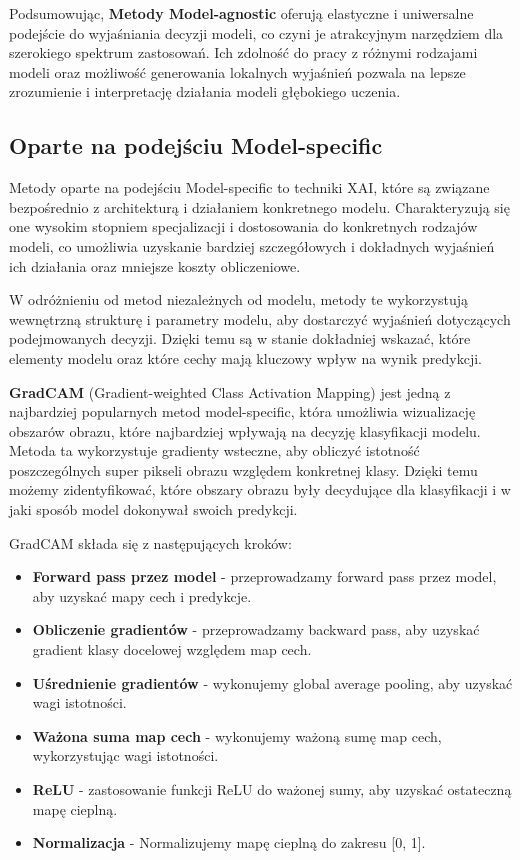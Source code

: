 \vspace{1cm}
Podsumowując, \textbf{Metody Model-agnostic} oferują elastyczne i uniwersalne podejście do wyjaśniania decyzji modeli, co czyni je atrakcyjnym narzędziem dla szerokiego spektrum zastosowań.
Ich zdolność do pracy z różnymi rodzajami modeli oraz możliwość generowania lokalnych wyjaśnień pozwala na lepsze zrozumienie i interpretację działania modeli głębokiego uczenia.

\subsection*{Oparte na podejściu Model-specific}
Metody oparte na podejściu Model-specific to techniki XAI, które są związane bezpośrednio z architekturą i działaniem konkretnego modelu.
Charakteryzują się one wysokim stopniem specjalizacji i dostosowania do konkretnych rodzajów modeli, co umożliwia uzyskanie bardziej szczegółowych i dokładnych wyjaśnień ich działania oraz mniejsze koszty obliczeniowe.

W odróżnieniu od metod niezależnych od modelu, metody te wykorzystują wewnętrzną strukturę i parametry modelu, aby dostarczyć wyjaśnień dotyczących podejmowanych decyzji.
Dzięki temu są w stanie dokładniej wskazać, które elementy modelu oraz które cechy mają kluczowy wpływ na wynik predykcji.

\textbf{GradCAM} (Gradient-weighted Class Activation Mapping) jest jedną z najbardziej popularnych metod model-specific, która umożliwia wizualizację obszarów obrazu, które najbardziej wpływają na decyzję klasyfikacji modelu.
Metoda ta wykorzystuje gradienty wsteczne, aby obliczyć istotność poszczególnych super pikseli obrazu względem konkretnej klasy.
Dzięki temu możemy zidentyfikować, które obszary obrazu były decydujące dla klasyfikacji i w jaki sposób model dokonywał swoich predykcji.

GradCAM składa się z następujących kroków:
\begin{itemize}
	\item \textbf{Forward pass przez model} - przeprowadzamy forward pass przez model, aby uzyskać mapy cech i predykcje.
	\item \textbf{Obliczenie gradientów} - przeprowadzamy backward pass, aby uzyskać gradient klasy docelowej względem map cech.
	\item \textbf{Uśrednienie gradientów} - wykonujemy global average pooling, aby uzyskać wagi istotności.
	\item \textbf{Ważona suma map cech} - wykonujemy ważoną sumę map cech, wykorzystując wagi istotności.
	\item \textbf{ReLU} - zastosowanie funkcji ReLU do ważonej sumy, aby uzyskać ostateczną mapę cieplną.
	\item \textbf{Normalizacja} - Normalizujemy mapę cieplną do zakresu [0, 1].
\end{itemize}


